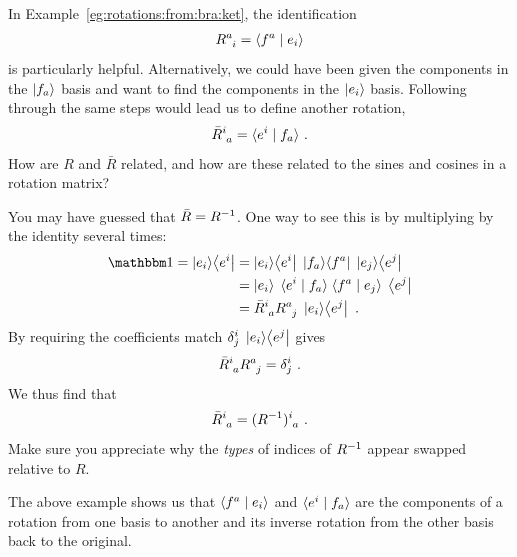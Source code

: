 \documentclass[12pt, oneside]{report}    %
\begin{document}
In Example~\ref{eg:rotations:from:bra:ket}, the identification
\begin{align}
    R\aij{a}{i} = \la f^a \mid e_i \ra
    \label{eq:rotation:from:bra:ket}
\end{align}
is particularly helpful. Alternatively, we could have been given the components in the $\left|f_a\right\rangle$ basis and want to find the components in the $\left|e_i\right\rangle$ basis. Following through the same steps would lead us to define another rotation,
\begin{align}
    \bar R\aij{i}{a} = \la e^i \mid f_a \ra \ .
    \label{eq:rotation:from:bra:ket:inv}
\end{align}
How are $R$ and $\bar R$ related, and how are these related to the sines and cosines in a rotation matrix?
\begin{example}
You may have guessed that $\bar R = R^{-1}$. One way to see this is by multiplying by the identity several times:
\begin{align}
    \one = \ket{e_i}\!\bra{e^i}
    &= 
    \ket{e_i}\!\bra{e^i}\;
    \ket{f_a}\!\bra{f^a}\;
    \ket{e_j}\!\bra{e^j} 
    \\
    &= 
    \ket{e_i}\; \la e^i \mid f_a \ra \; \la f^a \mid e_j \ra \; \bra{e^j}
    \\
    &= \bar{R}\aij{i}{a} R\aij{a}{j} \; \ket{e_i}\!\bra{e^j} \ .
\end{align}
By requiring the coefficients match $\delta^i_j\; \left|e_i\right\rangle\!\left\langle e^j\right|$ gives
\begin{align}
    \bar{R}\aij{i}{a} R\aij{a}{j} = \delta^i_j \ .
\end{align}
We thus find that
\begin{align}
    \bar{R}\aij{i}{a} = (R\inv)\aij{i}{a} \ .
\end{align}
Make sure you appreciate why the \emph{types} of indices of $R^{-1}$ appear swapped relative to $R$.
\end{example}
The above example shows us that $\langle f^a \mid e_i \rangle$ and $\langle e^i \mid f_a \rangle $ are the components of a rotation from one basis to another and its inverse rotation from the other basis back to the original. 
\end{document}
